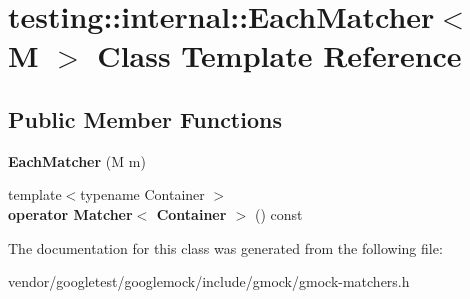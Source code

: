 \hypertarget{classtesting_1_1internal_1_1_each_matcher}{}\section{testing\+:\+:internal\+:\+:Each\+Matcher$<$ M $>$ Class Template Reference}
\label{classtesting_1_1internal_1_1_each_matcher}
\subsection*{Public Member Functions}
\begin{DoxyCompactItemize}
\item 
\mbox{\label{classtesting_1_1internal_1_1_each_matcher_a597f567d454f85733c66f7527f9aadb7}} 
{\bfseries Each\+Matcher} (M m)
\item 
\mbox{\label{classtesting_1_1internal_1_1_each_matcher_a81bd8bb67346dd2c07c7bf85a1b2d062}} 
{\footnotesize template$<$typename Container $>$ }\\{\bfseries operator Matcher$<$ Container $>$} () const
\end{DoxyCompactItemize}


The documentation for this class was generated from the following file\+:\begin{DoxyCompactItemize}
\item 
vendor/googletest/googlemock/include/gmock/gmock-\/matchers.\+h\end{DoxyCompactItemize}
